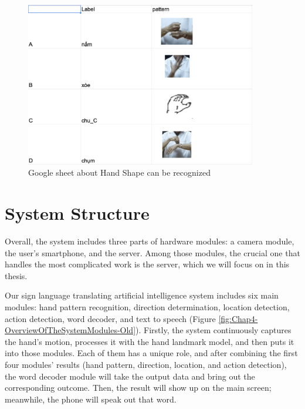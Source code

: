 \begin{figure}[H]
	\centering
	\includegraphics[width=0.9\textwidth]{img/Chap4/Sheet-Pattern.png}
	\caption{Google sheet about Hand Shape can be recognized}
	\label{fig:Chap4-Sheet-Pattern}
\end{figure}



\section{System Structure}

Overall, the system includes three parts of hardware modules: a camera module, the user's smartphone, and the server. Among those modules, the crucial one that handles the most complicated work is the server, which we will focus on in this thesis.

Our sign language translating artificial intelligence system includes six main modules: hand pattern recognition, direction determination, location detection, action detection, word decoder, and text to speech (Figure \ref{fig:Chap4-OverviewOfTheSystemModules-Old}). Firstly, the system continuously captures the hand's motion, processes it with the hand landmark model, and then puts it into those modules. Each of them has a unique role, and after combining the first four modules' results (hand pattern, direction, location, and action detection), the word decoder module will take the output data and bring out the corresponding outcome. Then, the result will show up on the main screen; meanwhile, the phone will speak out that word.

